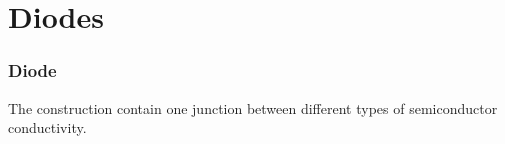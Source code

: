 \documentclass{beamer}
\begin{document}
\section{\texorpdfstring{Diodes}{Diodes}}
	\begin{frame}
    \frametitle{Diode}
		The construction contain one junction between different types of semiconductor conductivity.
	\end{frame}
\end{document}
